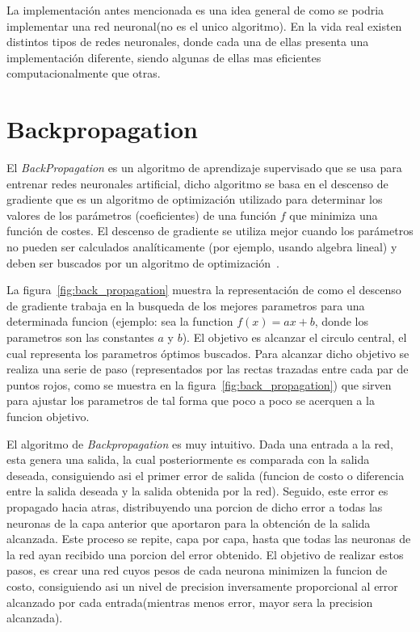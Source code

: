 La implementación antes mencionada es una idea general de como se podria implementar una red neuronal(no es el unico algoritmo). En la vida real existen distintos tipos de redes neuronales, donde cada una de ellas presenta una implementación diferente, siendo algunas de ellas mas eficientes computacionalmente que otras.

\section{Backpropagation}
\label{sub:backpropagation}
El \textit{BackPropagation} es un algoritmo de aprendizaje supervisado que se usa para entrenar redes neuronales artificial, dicho algoritmo se basa en el descenso de gradiente que es un algoritmo de optimización utilizado para determinar los valores de los parámetros (coeficientes) de una función $f$ que minimiza una función de costes. El descenso de gradiente se utiliza mejor cuando los parámetros no pueden ser calculados analíticamente (por ejemplo, usando algebra lineal) y deben ser buscados por un algoritmo de optimización~\cite{27lehr1993backpropagation}.

La figura~\ref{fig:back_propagation} muestra la representación de como el descenso de gradiente trabaja en la busqueda de los mejores parametros para una determinada funcion (ejemplo: sea la function $f(x)=ax+b$, donde los parametros son las constantes $a$ y $b$). El objetivo es alcanzar el circulo central, el cual representa los parametros óptimos buscados. Para alcanzar dicho objetivo se realiza una serie de paso (representados por las rectas trazadas entre cada par de puntos rojos, como se muestra en la figura~\ref{fig:back_propagation}) que sirven para ajustar los parametros de tal forma que poco a poco se acerquen a la funcion objetivo.

El algoritmo de \textit{Backpropagation} es muy intuitivo. Dada una entrada a la red, esta genera una salida, la cual posteriormente es comparada con la salida deseada, consiguiendo asi el primer error de salida (funcion de costo o diferencia entre la salida deseada y la salida obtenida por la red). Seguido, este error es propagado hacia atras, distribuyendo una porcion de dicho error a todas las neuronas de la capa anterior que aportaron para la obtención de la salida alcanzada. Este proceso se repite, capa por capa, hasta que todas las neuronas de la red ayan recibido una porcion del error obtenido. El objetivo de realizar estos pasos, es crear una red cuyos pesos de cada neurona minimizen la funcion de costo, consiguiendo asi un nivel de precision inversamente proporcional al error alcanzado por cada entrada(mientras menos error, mayor sera la precision alcanzada).

